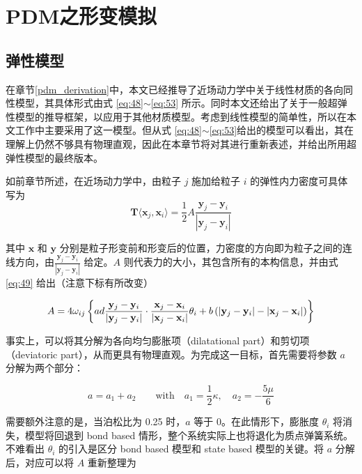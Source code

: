 ﻿\chapter{PDM之形变模拟}

\section{弹性模型}
\label{elasitcity_model}

在章节\ref{pdm_derivation}中，本文已经推导了近场动力学中关于线性材质的各向同性模型，其具体形式由式 \ref{eq:48}$\sim$\ref{eq:53} 所示。同时本文还给出了关于一般超弹性模型的推导框架，以应用于其他材质模型。考虑到线性模型的简单性，所以在本文工作中主要采用了这一模型。但从式 \ref{eq:48}$\sim$\ref{eq:53}给出的模型可以看出，其在理解上仍然不够具有物理直观，因此在本章节将对其进行重新表述，并给出所用超弹性模型的最终版本。

如前章节所述，在近场动力学中，由粒子 $j$ 施加给粒子 $i$ 的弹性内力密度可具体写为
\begin{equation}
\mathbf{T}\langle\mathbf{x}_j,\mathbf{x}_i\rangle = \frac{1}{2}A\frac{\mathbf{y}_j-\mathbf{y}_i}{|\mathbf{y}_j-\mathbf{y}_i|}
\end{equation}

其中 $\mathbf{x}$ 和 $\mathbf{y}$ 分别是粒子形变前和形变后的位置，力密度的方向即为粒子之间的连线方向，由$\frac{\mathbf{y}_j-\mathbf{y}_i}{|\mathbf{y}_j-\mathbf{y}_i|}$ 给定。$A$ 则代表力的大小，其包含所有的本构信息，并由式 \ref{eq:49} 给出（注意下标有所改变）

\begin{equation}
A = 4\omega_{ij}\left\{ad\frac{\mathbf{y}_j-\mathbf{y}_i}{|\mathbf{y}_j-\mathbf{y}_i|}\cdot\frac{\mathbf{x}_j-\mathbf{x}_i}{|\mathbf{x}_j-\mathbf{x}_i|}\theta_i
   +b\left(|\mathbf{y}_j - \mathbf{y}_i| - |\mathbf{x}_j - \mathbf{x}_i|\right) \right\}
\end{equation}

事实上，可以将其分解为各向均匀膨胀项（dilatational part）和剪切项（deviatoric part），从而更具有物理直观。为完成这一目标，首先需要将参数 $a$ 分解为两个部分：

\begin{equation}
a = a_1 + a_2 \qquad \mathrm{with}\quad a_1 = \frac{1}{2}\kappa ,\quad a_2 = -\frac{5\mu}{6}
\end{equation}

需要额外注意的是，当泊松比为 0.25 时，$a$ 等于 0。在此情形下，膨胀度 $\theta_i$ 将消失，模型将回退到 bond based 情形，整个系统实际上也将退化为质点弹簧系统。不难看出 $\theta_i$ 的引入是区分 bond based 模型和 state based 模型的关键。将 $a$ 分解后，对应可以将 $A$ 重新整理为

